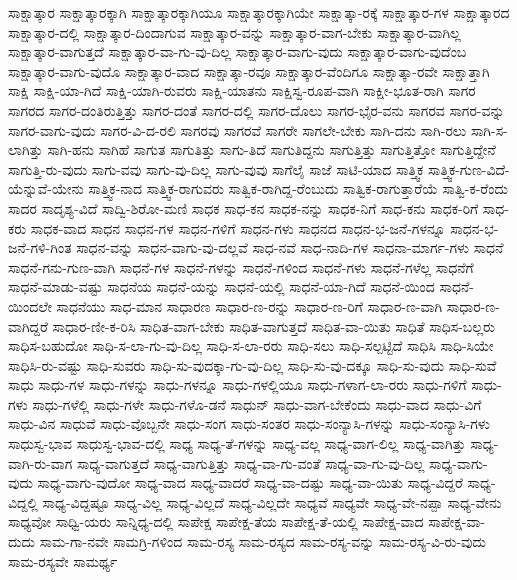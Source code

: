 ಸಾಕ್ಷಾತ್ಕಾರ
ಸಾಕ್ಷಾತ್ಕಾರಕ್ಕಾಗಿ
ಸಾಕ್ಷಾತ್ಕಾರಕ್ಕಾಗಿಯೂ
ಸಾಕ್ಷಾತ್ಕಾರಕ್ಕಾಗಿಯೇ
ಸಾಕ್ಷಾತ್ಕಾ-ರಕ್ಕೆ
ಸಾಕ್ಷಾತ್ಕಾರ-ಗಳ
ಸಾಕ್ಷಾತ್ಕಾರದ
ಸಾಕ್ಷಾತ್ಕಾರ-ದಲ್ಲಿ
ಸಾಕ್ಷಾತ್ಕಾರ-ದಿಂದಾಗುವ
ಸಾಕ್ಷಾತ್ಕಾರ-ವನ್ನು
ಸಾಕ್ಷಾತ್ಕಾರ-ವಾಗ-ಬೇಕು
ಸಾಕ್ಷಾತ್ಕಾರ-ವಾಗಿಲ್ಲ
ಸಾಕ್ಷಾತ್ಕಾರ-ವಾಗುತ್ತದೆ
ಸಾಕ್ಷಾತ್ಕಾರ-ವಾ-ಗು-ವು-ದಿಲ್ಲ
ಸಾಕ್ಷಾತ್ಕಾರ-ವಾಗು-ವುದು
ಸಾಕ್ಷಾತ್ಕಾರ-ವಾಗು-ವುದೆಂಬ
ಸಾಕ್ಷಾತ್ಕಾರ-ವಾಗು-ವುದೊ
ಸಾಕ್ಷಾತ್ಕಾರ-ವಾದ
ಸಾಕ್ಷಾತ್ಕಾ-ರವೂ
ಸಾಕ್ಷಾತ್ಕಾರ-ವೆಂದಿಗೂ
ಸಾಕ್ಷಾತ್ಕಾ-ರವೇ
ಸಾಕ್ಷಾತ್ತಾಗಿ
ಸಾಕ್ಷಿ
ಸಾಕ್ಷಿ-ಯಾ-ಗಿದೆ
ಸಾಕ್ಷಿ-ಯಾಗಿ-ರುವರು
ಸಾಕ್ಷಿ-ಯಾತನು
ಸಾಕ್ಷಿಸ್ವ-ರೂಪ-ವಾಗಿ
ಸಾಕ್ಷೀ-ಭೂತ-ರಾಗಿ
ಸಾಗರ
ಸಾಗರದ
ಸಾಗರ-ದಂತಿರುತ್ತಿತ್ತು
ಸಾಗರ-ದಂತೆ
ಸಾಗರ-ದಲ್ಲಿ
ಸಾಗರ-ದೊಲು
ಸಾಗರ-ಭೈರ-ವನು
ಸಾಗರವ
ಸಾಗರ-ವನ್ನು
ಸಾಗರ-ವಾಗು-ವುದು
ಸಾಗರ-ವಿ-ದ-ರಲಿ
ಸಾಗರವು
ಸಾಗರವೆ
ಸಾಗರೇ
ಸಾಗಲೇ-ಬೇಕು
ಸಾಗಿ-ದನು
ಸಾಗಿ-ರಲು
ಸಾಗಿ-ಸ-ಲಾಗಿತ್ತು
ಸಾಗಿ-ಹನು
ಸಾಗಿಹೆ
ಸಾಗುತ
ಸಾಗುತಿತ್ತು
ಸಾಗು-ತಿದೆ
ಸಾಗುತಿದ್ದನು
ಸಾಗುತ್ತಿತ್ತು
ಸಾಗುತ್ತಿತ್ತೋ
ಸಾಗುತ್ತಿದ್ದೇನೆ
ಸಾಗುತ್ತಿ-ರು-ವುದು
ಸಾಗು-ವವು
ಸಾಗು-ವು-ದಿಲ್ಲ
ಸಾಗು-ವುವು
ಸಾಗೆಲೈ
ಸಾಜೆ
ಸಾಟಿ-ಯಾದ
ಸಾತ್ತ್ವಿಕ
ಸಾತ್ತ್ವಿಕ-ಗುಣ-ವಿದೆ-ಯೆನ್ನುವೆ-ಯೇನು
ಸಾತ್ತ್ವಿಕ-ನಾದ
ಸಾತ್ತ್ವಿಕ-ರಾಗುವರು
ಸಾತ್ವಿಕ-ರಾಗಿದ್ದ-ರೆಂಬುದು
ಸಾತ್ವಿಕ-ರಾಗುತ್ತಾರೆಯೆ
ಸಾತ್ವಿ-ಕ-ರೆಂದು
ಸಾದರ
ಸಾದೃಶ್ಯ-ವಿದೆ
ಸಾದ್ವಿ-ಶಿರೋ-ಮಣಿ
ಸಾಧಕ
ಸಾಧ-ಕನ
ಸಾಧಕ-ನನ್ನು
ಸಾಧಕ-ನಿಗೆ
ಸಾಧ-ಕನು
ಸಾಧಕ-ರಿಗೆ
ಸಾಧ-ಕರು
ಸಾಧಕ-ವಾದ
ಸಾಧನ
ಸಾಧನ-ಗಳ
ಸಾಧನ-ಗಳಿಗೆ
ಸಾಧನ-ಗಳು
ಸಾಧನದ
ಸಾಧನ-ಭ-ಜನೆ-ಗಳನ್ನೂ
ಸಾಧನ-ಭ-ಜನೆ-ಗಳಿ-ಗಿಂತ
ಸಾಧನ-ವನ್ನು
ಸಾಧನ-ವಾಗು-ವು-ದಲ್ಲವೆ
ಸಾಧ-ನವೆ
ಸಾಧ-ನಾದಿ-ಗಳ
ಸಾಧನಾ-ಮಾರ್ಗ-ಗಳು
ಸಾಧನೆ
ಸಾಧನೆ-ಗನು-ಗುಣ-ವಾಗಿ
ಸಾಧನೆ-ಗಳ
ಸಾಧನೆ-ಗಳನ್ನು
ಸಾಧನೆ-ಗಳಿಂದ
ಸಾಧನೆ-ಗಳು
ಸಾಧನೆ-ಗಳೆಲ್ಲ
ಸಾಧನೆಗೆ
ಸಾಧನೆ-ಮಾಡು-ವಷ್ಟು
ಸಾಧನೆಯ
ಸಾಧನೆ-ಯನ್ನು
ಸಾಧನೆ-ಯಲ್ಲಿ
ಸಾಧನೆ-ಯಾ-ಗಿದೆ
ಸಾಧನೆ-ಯಿಂದ
ಸಾಧನೆ-ಯಿಂದಲೇ
ಸಾಧನೆಯು
ಸಾಧ-ಮಾನ
ಸಾಧಾರಣ
ಸಾಧಾರ-ಣ-ರನ್ನು
ಸಾಧಾರ-ಣ-ರಿಗೆ
ಸಾಧಾರ-ಣ-ವಾಗಿ
ಸಾಧಾರ-ಣ-ವಾಗಿದ್ದರೆ
ಸಾಧಾರ-ಣೀ-ಕ-ರಿಸಿ
ಸಾಧಿತ-ವಾಗ-ಬೇಕು
ಸಾಧಿತ-ವಾಗುತ್ತದೆ
ಸಾಧಿತ-ವಾ-ಯಿತು
ಸಾಧಿತೆ
ಸಾಧಿಸ-ಬಲ್ಲರು
ಸಾಧಿಸ-ಬಹುದೋ
ಸಾಧಿ-ಸ-ಲಾ-ಗು-ವು-ದಿಲ್ಲ
ಸಾಧಿ-ಸ-ಲಾ-ರರು
ಸಾಧಿ-ಸಲು
ಸಾಧಿ-ಸಲ್ಪಟ್ಟಿದೆ
ಸಾಧಿಸಿ
ಸಾಧಿ-ಸಿಯೇ
ಸಾಧಿಸಿ-ರು-ವಷ್ಟು
ಸಾಧಿ-ಸುವರು
ಸಾಧಿ-ಸು-ವುದಕ್ಕಾ-ಗು-ವು-ದಿಲ್ಲ
ಸಾಧಿ-ಸು-ವು-ದಕ್ಕೂ
ಸಾಧಿ-ಸು-ವುದು
ಸಾಧಿ-ಸುವೆ
ಸಾಧು
ಸಾಧು-ಗಳ
ಸಾಧು-ಗಳನ್ನು
ಸಾಧು-ಗಳನ್ನೂ
ಸಾಧು-ಗಳಲ್ಲಿಯೂ
ಸಾಧು-ಗಳಾಗ-ಲಾ-ರರು
ಸಾಧು-ಗಳಿಗೆ
ಸಾಧು-ಗಳು
ಸಾಧು-ಗಳೆಲ್ಲಿ
ಸಾಧು-ಗಳೇ
ಸಾಧು-ಗಳೊ-ಡನೆ
ಸಾಧುನ್
ಸಾಧು-ವಾಗ-ಬೇಕೆಂದು
ಸಾಧು-ವಾದ
ಸಾಧು-ವಿಗೆ
ಸಾಧು-ವಿನ
ಸಾಧುವೆ
ಸಾಧು-ವೊಬ್ಬನೇ
ಸಾಧು-ಸಂಗ
ಸಾಧು-ಸಂತರ
ಸಾಧು-ಸಂನ್ಯಾಸಿ-ಗಳನ್ನು
ಸಾಧು-ಸಂನ್ಯಾಸಿ-ಗಳು
ಸಾಧುಸ್ವ-ಭಾವ
ಸಾಧುಸ್ವ-ಭಾವ-ದಲ್ಲಿ
ಸಾಧ್ಯ
ಸಾಧ್ಯ-ತೆ-ಗಳನ್ನು
ಸಾಧ್ಯ-ವಲ್ಲ
ಸಾಧ್ಯ-ವಾಗ-ಲಿಲ್ಲ
ಸಾಧ್ಯ-ವಾಗಿತ್ತು
ಸಾಧ್ಯ-ವಾಗಿ-ರು-ವಾಗ
ಸಾಧ್ಯ-ವಾಗುತ್ತದೆ
ಸಾಧ್ಯ-ವಾಗುತ್ತಿತ್ತು
ಸಾಧ್ಯ-ವಾ-ಗು-ವಂತೆ
ಸಾಧ್ಯ-ವಾ-ಗು-ವು-ದಿಲ್ಲ
ಸಾಧ್ಯ-ವಾಗು-ವುದು
ಸಾಧ್ಯ-ವಾಗು-ವುದೋ
ಸಾಧ್ಯ-ವಾದ
ಸಾಧ್ಯ-ವಾದರೆ
ಸಾಧ್ಯ-ವಾ-ದಷ್ಟು
ಸಾಧ್ಯ-ವಾ-ಯಿತು
ಸಾಧ್ಯ-ವಿದ್ದರೆ
ಸಾಧ್ಯ-ವಿದ್ದಲ್ಲಿ
ಸಾಧ್ಯ-ವಿದ್ದಷ್ಟೂ
ಸಾಧ್ಯ-ವಿಲ್ಲ
ಸಾಧ್ಯ-ವಿಲ್ಲದೆ
ಸಾಧ್ಯ-ವಿಲ್ಲದೇ
ಸಾಧ್ಯವೆ
ಸಾಧ್ಯವೇ
ಸಾಧ್ಯ-ವೇ-ನಪ್ಪಾ
ಸಾಧ್ಯ-ವೇನು
ಸಾಧ್ಯವೋ
ಸಾಧ್ವಿ-ಯರು
ಸಾನ್ನಿಧ್ಯ-ದಲ್ಲಿ
ಸಾಪೇಕ್ಷ
ಸಾಪೇಕ್ಷ-ತೆಯ
ಸಾಪೇಕ್ಷ-ತೆ-ಯಲ್ಲಿ
ಸಾಪೇಕ್ಷ-ವಾದ
ಸಾಪೇಕ್ಷ-ವಾ-ದುದು
ಸಾಮ-ಗಾ-ನವೇ
ಸಾಮಗ್ರಿ-ಗಳಿಂದ
ಸಾಮ-ರಸ್ಯ
ಸಾಮ-ರಸ್ಯದ
ಸಾಮ-ರಸ್ಯ-ವನ್ನು
ಸಾಮ-ರಸ್ಯ-ವಿ-ರು-ವುದು
ಸಾಮ-ರಸ್ಯವೇ
ಸಾಮರ್ಥ್ಯ
